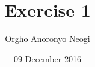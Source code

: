 \documentclass[oneside]{article}
\title{Exercise 1}
\author{Orgho Anoronyo Neogi}
\date{09 December 2016}
\begin{document}
\maketitle

\begin{enumerate}

\end{enumerate}
\end{document}
